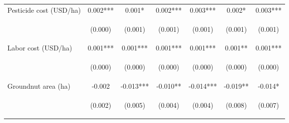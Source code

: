 \begin{center}
\begin{tabular}{lcccccc}
Pesticide cost (USD/ha) & 0.002*** & 0.001* & 0.002*** & 0.003*** & 0.002* & 0.003*** \\
\vspace{4pt} & \begin{footnotesize}(0.000)\end{footnotesize} & \begin{footnotesize}(0.001)\end{footnotesize} & \begin{footnotesize}(0.001)\end{footnotesize} & \begin{footnotesize}(0.001)\end{footnotesize} & \begin{footnotesize}(0.001)\end{footnotesize} & \begin{footnotesize}(0.001)\end{footnotesize} \\
Labor cost (USD/ha) & 0.001*** & 0.001*** & 0.001*** & 0.001*** & 0.001** & 0.001*** \\
\vspace{4pt} & \begin{footnotesize}(0.000)\end{footnotesize} & \begin{footnotesize}(0.000)\end{footnotesize} & \begin{footnotesize}(0.000)\end{footnotesize} & \begin{footnotesize}(0.000)\end{footnotesize} & \begin{footnotesize}(0.000)\end{footnotesize} & \begin{footnotesize}(0.000)\end{footnotesize} \\
Groundnut area (ha) & -0.002 & -0.013*** & -0.010** & -0.014*** & -0.019** & -0.014* \\
\vspace{4pt} & \begin{footnotesize}(0.002)\end{footnotesize} & \begin{footnotesize}(0.005)\end{footnotesize} & \begin{footnotesize}(0.004)\end{footnotesize} & \begin{footnotesize}(0.004)\end{footnotesize} & \begin{footnotesize}(0.008)\end{footnotesize} & \begin{footnotesize}(0.007)\end{footnotesize} \\

\end{tabular}
\end{center}
